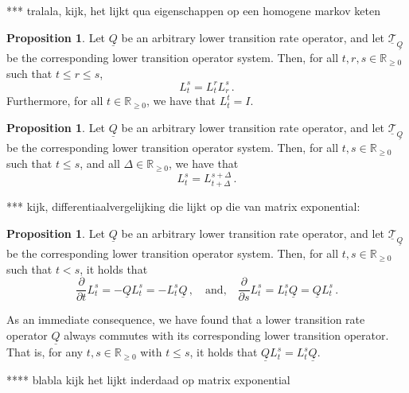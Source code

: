 \documentclass[10pt]{paper}
\theoremstyle{definition}
\newtheorem{proposition}[theorem]{Proposition}
\newcommand{\reals}{\mathbb{R}}
\newcommand{\realsnonneg}{\reals_{\geq 0}}
\newcommand{\lbound}{L}
\newcommand{\lrate}{\underline{Q}}
\begin{document}
*** tralala, kijk, het lijkt qua eigenschappen op een homogene markov keten

\begin{proposition}\label{prop:lower_trans_system_is_system}
Let $\lrate$ be an arbitrary lower transition rate operator, and let $\underline{\mathcal{T}}_{\lrate}$ be the corresponding lower transition operator system. Then, for all $t,r,s\in\realsnonneg$ such that $t\leq r\leq s$,
\begin{equation*}
L_t^s = L_t^rL_r^s\,.
\end{equation*}
Furthermore, for all $t\in\realsnonneg$, we have that $L_t^t=I$.
\end{proposition}

\begin{proposition}\label{prop:lower_transition_is_homogeneous}
Let $\lrate$ be an arbitrary lower transition rate operator, and let $\underline{\mathcal{T}}_{\lrate}$ be the corresponding lower transition operator system. Then, for all $t,s\in\realsnonneg$ such that $t\leq s$, and all $\Delta\in\realsnonneg$, we have that
\begin{equation*}
L_t^s = L_{t+\Delta}^{s+\Delta}\,.
\end{equation*}
\end{proposition}

*** kijk, differentiaalvergelijking die lijkt op die van matrix exponential:

\begin{proposition}\label{prop:lower_transition_has_deriv}
Let $\lrate$ be an arbitrary lower transition rate operator, and let $\underline{\mathcal{T}}_{\lrate}$ be the corresponding lower transition operator system. Then, for all $t,s\in\realsnonneg$ such that $t<s$, it holds that
\begin{equation*}
\frac{\partial}{\partial t}\lbound_t^s=-\lrate\lbound_t^s=-\lbound_t^s\lrate\,,\quad\text{and,}\quad\frac{\partial}{\partial s}\lbound_t^s=\lbound_t^s\lrate=\lrate\lbound_t^s\,.
\end{equation*}
\end{proposition}
As an immediate consequence, we have found that a lower transition rate operator $\lrate$ always commutes with its corresponding lower transition operator. That is, for any $t,s\in\realsnonneg$ with $t\leq s$, it holds that $\lrate L_t^s=L_t^s\lrate$.

**** blabla kijk het lijkt inderdaad op matrix exponential
\end{document}
